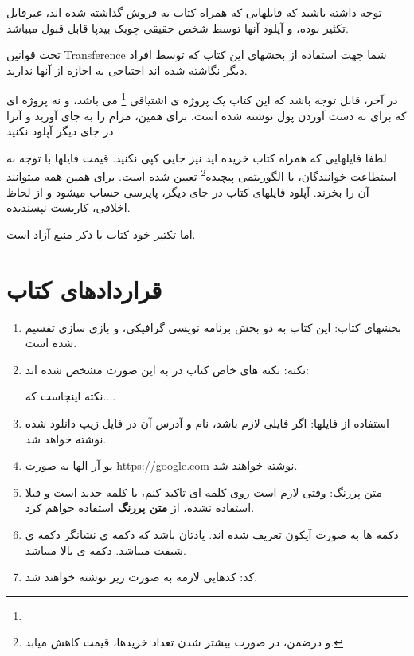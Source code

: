 \documentclass[14pt,a4paper]{memoir}
\begin{document}
	 توجه داشته باشید که فایلهایی که همراه کتاب به فروش گذاشته شده اند، غیرقابل تکثیر بوده، و آپلود آنها توسط شخص حقیقی چوبک بیدپا قابل قبول میباشد.
	 
	 تحت قوانین Transference شما جهت استفاده از بخشهای این کتاب که توسط افراد دیگر نگاشته شده اند احتیاجی به اجازه از آنها ندارید.
	 
	 در آخر، قابل توجه باشد که این کتاب یک پروژه ی اشتیاقی \footnote{} می باشد، و نه پروژه ای که برای به دست آوردن پول نوشته شده است. برای همین، مرام را به جای آورید و آنرا در جای دیگر آپلود نکنید.
	 
	 لطفا فایلهایی که همراه کتاب خریده اید نیز جایی کپی نکنید. قیمت فایلها با توجه به استطاعت خوانندگان، با الگوریتمی پیچیده\footnote{و درضمن، در صورت بیشتر شدن تعداد خریدها، قیمت کاهش میابد.} تعیین شده است. برای همین همه میتوانند آن را بخرند. آپلود فایلهای کتاب در جای دیگر، پایرسی حساب میشود و از لحاظ اخلاقی، کاریست نپسندیده.
	 
	 اما تکثیر خود کتاب با ذکر منبع آزاد است.
	  	 
	 
	 
	 \chapter*{قراردادهای کتاب}
	 
	 \begin{enumerate}
	 	\item  بخشهای کتاب: این کتاب به دو بخش برنامه نویسی گرافیکی، و بازی سازی تقسیم شده است.
	 	\item  نکته: نکته های خاص کتاب در به این صورت مشخص شده اند:
	 		
	 	
	 				\begin{tip}
	 					نکته اینجاست که....
	 				\end{tip}
	 
	 \item استفاده از فایلها: اگر فایلی لازم باشد، نام و آدرس آن در فایل زیپ دانلود شده نوشته خواهد شد.
	 \item یو آر الها به صورت \url{https://google.com} نوشته خواهند شد.
	 \item متن پررنگ: وقتی لازم است روی کلمه ای تاکید کنم، یا کلمه جدید است و قبلا استفاده نشده، از \textbf{متن پررنگ} استفاده خواهم کرد.
	 \item  دکمه ها به صورت آیکون تعریف شده اند. یادتان باشد که دکمه ی \keys{\shift} نشانگر دکمه ی شیفت میباشد. دکمه ی بالا \keys{$\uparrow$} میباشد.
	 \item کد: کدهایی لازمه به صورت زیر نوشته خواهند شد.
	 
	 
	\begin{latin}
	
	\end{latin}
	 
	\end{enumerate}
	 
\end{document}

